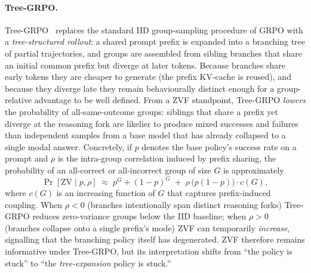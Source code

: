 \paragraph{Tree-GRPO.}
Tree-GRPO~\cite{treegrpo2025} replaces the standard IID group-sampling
procedure of GRPO with a \emph{tree-structured rollout}: a shared prompt
prefix is expanded into a branching tree of partial trajectories, and groups
are assembled from sibling branches that share an initial common prefix but
diverge at later tokens. Because branches share early tokens they are
cheaper to generate (the prefix KV-cache is reused), and because they diverge
late they remain behaviourally distinct enough for a group-relative
advantage to be well defined. From a ZVF standpoint, Tree-GRPO
\emph{lowers} the probability of all-same-outcome groups: siblings that share
a prefix yet diverge at the reasoning fork are likelier to produce mixed
successes and failures than independent samples from a base model that has
already collapsed to a single modal answer. Concretely, if $p$ denotes the
base policy's success rate on a prompt and $\rho$ is the intra-group
correlation induced by prefix sharing, the probability of an all-correct or
all-incorrect group of size $G$ is approximately
\begin{equation}
\Pr[\mathrm{ZV}\mid p, \rho]
\;\approx\;
p^{G} + (1-p)^{G}
\;+\; \rho \, \bigl(p(1-p)\bigr) \cdot c(G),
\end{equation}
where $c(G)$ is an increasing function of $G$ that captures prefix-induced
coupling. When $\rho < 0$ (branches intentionally span distinct reasoning
forks) Tree-GRPO reduces zero-variance groups below the IID baseline; when
$\rho > 0$ (branches collapse onto a single prefix's mode) ZVF can
temporarily \emph{increase}, signalling that the branching policy itself has
degenerated. ZVF therefore remains informative under Tree-GRPO, but its
interpretation shifts from ``the policy is stuck'' to ``the
\emph{tree-expansion} policy is stuck.''

